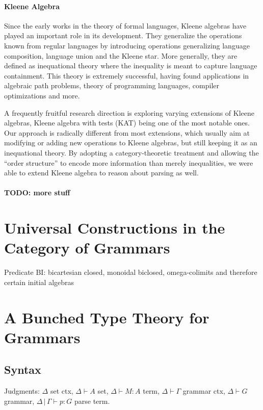 \documentclass[sigconf,anonymous,review,screen]{acmart}
\newcommand{\pipe}{\,|\,}
\begin{document}
\paragraph{Kleene Algebra}

Since the early works in the theory of formal languages, Kleene
algebras have played an important role in its development. They
generalize the operations known from regular languages by introducing
operations generalizing language composition, language union and the
Kleene star.  More generally, they are defined as inequational theory
where the inequality is meant to capture language containment. This
theory is extremely successful, having found applications in algebraic
path problems, theory of programming languages, compiler optimizations
and more.

A frequently fruitful research direction is exploring varying
extensions of Kleene algebras, Kleene algebra with tests (KAT) being
one of the most notable ones. Our approach is radically different from
most extensions, which usually aim at modifying or adding new
operations to Kleene algebras, but still keeping it as an inequational
theory. By adopting a category-theoretic treatment and allowing the
``order structure'' to encode more information than merely
inequalities, we were able to extend Kleene algebra to reason about
parsing as well.

\paragraph{TODO: more stuff}




\section{Universal Constructions in the Category of Grammars}

Predicate BI: bicartesian closed, monoidal biclosed, omega-colimits
and therefore certain initial algebras



\section{A Bunched Type Theory for Grammars}

\subsection{Syntax}
Judgments: $\Delta$ set ctx, $\Delta \vdash A$ set, $\Delta \vdash M :
A$ term, $\Delta \vdash \Gamma$ grammar ctx, $\Delta \vdash G$
grammar, $\Delta\pipe \Gamma \vdash p : G$ parse term.
\end{document}
